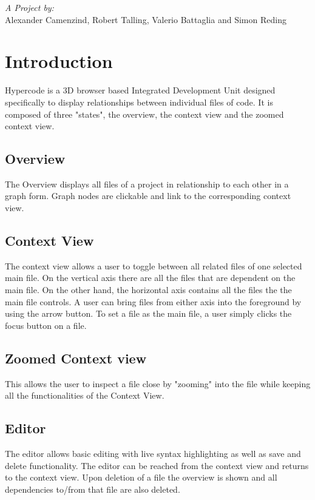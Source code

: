 \documentclass[a4paper]{article}
\author{Client: \realauthor \\
Universit\`a della Svizzera italiana - \coursename}
\title{\assingmentnr}
\begin{document}
\maketitle{\raggedleft}
\emph{A Project by:}\\
Alexander Camenzind, Robert Talling, Valerio Battaglia and Simon Reding


\section{Introduction}
Hypercode is a 3D browser based Integrated Development Unit designed specifically to display relationships between individual files of code. It is composed of three "states", the overview, the context view and the zoomed context view.
\subsection{Overview}
The Overview displays all files of a project in relationship to each other in a graph form. Graph nodes are clickable and link to the corresponding context view.
\subsection{Context View}
The context view allows a user to toggle between all related files of one selected main file. On the vertical axis there are all the files that are dependent on the main file. On the other hand, the horizontal axis contains all the files the the main file controls. A user can bring files from either axis into the foreground by using the arrow button. To set a file as the main file, a user simply clicks the focus button on a file. 

\subsection{Zoomed Context view}
This allows the user to inspect a file close by "zooming" into the file while keeping all the functionalities of the Context View.

\subsection{Editor}
The editor allows basic editing with live syntax highlighting as well as save and delete functionality. The editor can be reached from the context view and returns to the context view. Upon deletion of a file the overview is shown and all dependencies to/from that file are also deleted.
\end{document}
